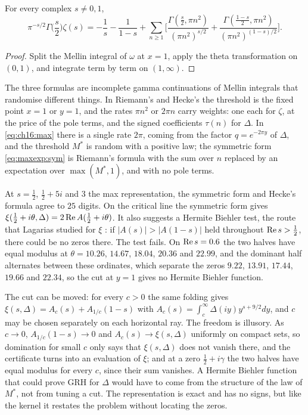 \begin{proposition}[Riemann]\label{prop:maxexp:riemann}
For every complex $s\ne0,1$,
\[
\pi^{-s/2}\Gamma\Big(\frac s2\Big)\zeta(s)=-\frac1s-\frac1{1-s}+\sum_{n\ge1}\Big[\frac{\Gamma(\frac s2,\pi n^2)}{(\pi n^2)^{s/2}}+\frac{\Gamma(\frac{1-s}2,\pi n^2)}{(\pi n^2)^{(1-s)/2}}\Big].
\]
\end{proposition}

\begin{proof}
Split the Mellin integral of $\omega$ at $x=1$, apply the theta transformation on $(0,1)$, and integrate term by term on $(1,\infty)$.
\end{proof}

The three formulas are incomplete gamma continuations of Mellin integrals that randomise different things. In Riemann's and Hecke's the threshold is the fixed point $x=1$ or $y=1$, and the rates $\pi n^2$ or $2\pi n$ carry weights: one each for $\zeta$, at the price of the pole terms, and the signed coefficients $\tau(n)$ for $\Delta$. In \eqref{eq:ch16:max} there is a single rate $2\pi$, coming from the factor $q=e^{-2\pi y}$ of $\Delta$, and the threshold $M^*$ is random with a positive law; the symmetric form \eqref{eq:maxexp:sym} is Riemann's formula with the sum over $n$ replaced by an expectation over $\max(M^*,1)$, and with no pole terms.

At $s=\frac12$, $\frac12+5i$ and $3$ the max representation, the symmetric form and Hecke's formula agree to $25$ digits. On the critical line the symmetric form gives $\xi(\frac12+i\theta,\Delta)=2\operatorname{Re} A(\frac12+i\theta)$. It also suggests a Hermite Biehler test, the route that Lagarias studied for $\xi$ \cite{Lagarias05}: if $|A(s)|>|A(1-s)|$ held throughout $\operatorname{Re} s>\frac12$, there could be no zeros there. The test fails. On $\operatorname{Re} s=0.6$ the two halves have equal modulus at $\theta=10.26$, $14.67$, $18.04$, $20.36$ and $22.99$, and the dominant half alternates between these ordinates, which separate the zeros $9.22$, $13.91$, $17.44$, $19.66$ and $22.34$, so the cut at $y=1$ gives no Hermite Biehler function.

The cut can be moved: for every $c>0$ the same folding gives $\xi(s,\Delta)=A_c(s)+A_{1/c}(1-s)$ with $A_c(s)=\int_c^\infty\Delta(iy)y^{s+9/2}dy$, and $c$ may be chosen separately on each horizontal ray. The freedom is illusory. As $c\to0$, $A_{1/c}(1-s)\to0$ and $A_c(s)\to\xi(s,\Delta)$ uniformly on compact sets, so domination for small $c$ only says that $\xi(s,\Delta)$ does not vanish there, and the certificate turns into an evaluation of $\xi$; and at a zero $\frac12+i\gamma$ the two halves have equal modulus for every $c$, since their sum vanishes. A Hermite Biehler function that could prove GRH for $\Delta$ would have to come from the structure of the law of $M^*$, not from tuning a cut. The representation is exact and has no signs, but like the kernel it restates the problem without locating the zeros.

